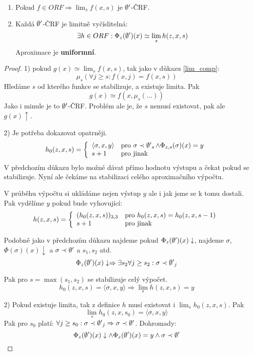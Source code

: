 \begin{theorem}
	\begin{enumerate}
		\item Pokud $f \in ORF \Rightarrow \lim_s f(x, s)$ je $\operatorname{\emptyset^{\prime}}$-ČRF.
		\item Každá $\operatorname{\emptyset^{\prime}}$-ČRF je limitně vyčíslitelná:
			\[ \exists h \in ORF: \Phi_{z}(\operatorname{\emptyset^{\prime}})(x) \simeq \lim_s h(z, x, s) \]
		Aproximace je \textbf{uniformní}.
	\end{enumerate}
\end{theorem}
\begin{proof}
	1) pokud $g(x) \simeq \lim_s f(x, s)$, tak jako v důkazu \cref{lim_comp}:
	\[ \mu_s(\forall j \geq s: f(x, j) = f(x, s)) \]
	Hledáme $s$ od kterého funkce se stabilizuje, a existuje limita.
	Pak
	\[ g(x) \simeq f(x, \mu_s(\ldots)) \]
	Jako i minule je to $\operatorname{\emptyset^{\prime}}$-ČRF.
	Problém ale je, že $s$ nemusí existovat, pak ale $g(x) \uparrow$.

	2) Je potřeba dokazovat opatrněji.
	\[ h_0(z, x, s) = \left\{ \begin{array}{ll}  \langle \sigma, x, y \rangle & \mbox{pro }  \sigma \prec \operatorname{\emptyset^{\prime}}_s \land \Phi_{z, s}(\sigma)(x) = y \\ s + 1 & \mbox{pro } \text{jinak} \end{array} \right. \]
	V předchozím důkazu bylo možné dávat přímo hodnotu výstupu a čekat pokud se stabilizuje.
	Nyní ale čekáme na stabilizaci celého aproximačního výpočtu.

	V průběhu výpočtu si ukládáme nejen výstup $y$ ale i jak jsme se k tomu dostali.
	Pak vydělíme $y$ pokud bude vyhovující:
	\[ h(z, x, s) = \left\{ \begin{array}{ll}  (h_0(z, x, s))_{3, 3}  & \mbox{pro }  h_0(z, x, s) = h_0(z, x, s - 1) \\ s + 1 & \mbox{pro } \text{jinak} \end{array} \right. \]

	Podobně jako v předchozím důkazu najdeme pokud $\Phi_z(\operatorname{\emptyset^{\prime}})(x)\downarrow$, najdeme $\sigma$, $\Phi(\sigma)(x)\downarrow$ a $\sigma \prec \operatorname{\emptyset^{\prime}}$ a $s_1,s_2$  atd.
	\[ \Phi_z(\operatorname{\emptyset^{\prime}})(x) \downarrow \Rightarrow \exists s_2 \forall j \geq s_2: \sigma \prec \operatorname{\emptyset^{\prime}}_j \]

	Pak pro $s = \max(s_1, s_2)$ se stabilizuje celý výpočet.
	\[ h_0(z, x, s) = \langle \sigma, x, y \rangle \Rightarrow \lim_s h(z, x, s) = y \]

	2) Pokud existuje limita, tak z definice $h$ musí existovat i $\lim_s h_0(z, x, s)$.
	Pak
	\[ \lim_s h_0(z, x, s_0) = \langle \sigma, x, y \rangle \]
	Pak pro $s_0$ platí: $\forall j \geq s_0: \sigma \prec \operatorname{\emptyset^{\prime}}_j \Rightarrow \sigma \prec \operatorname{\emptyset^{\prime}}$.
	Dohromady:
	\[ \Phi_z(\operatorname{\emptyset^{\prime}})(x) \downarrow \land \Phi_z(\operatorname{\emptyset^{\prime}})(x) = y \land \sigma \prec \operatorname{\emptyset^{\prime}} \]

\end{proof}

